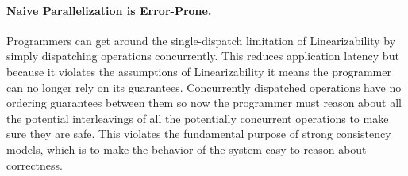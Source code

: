 


\paragraph{Naive Parallelization is Error-Prone.}
Programmers can get around the single-dispatch limitation of Linearizability by simply dispatching operations concurrently.
This reduces application latency but because it violates the assumptions of Linearizability it means the programmer can no longer rely on its guarantees. Concurrently dispatched operations have no ordering guarantees between them so now the programmer must reason about all the potential interleavings of all the potentially concurrent operations to make sure they are safe. This violates the fundamental purpose of strong consistency models, which is to make the behavior of the system easy to reason about correctness.

